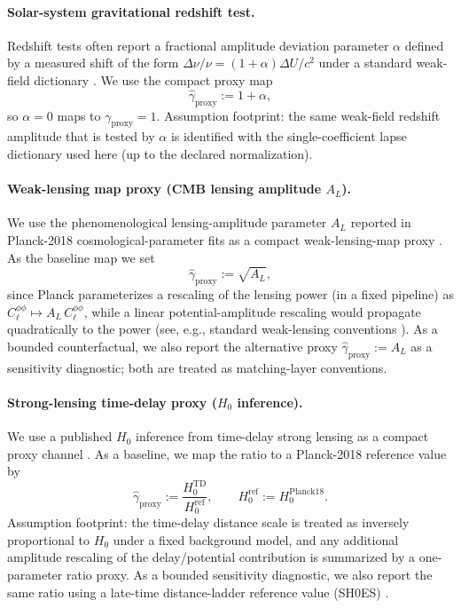 \paragraph{Solar-system gravitational redshift test.}
\MatchTag Redshift tests often report a fractional amplitude deviation parameter $\alpha$ defined by a measured shift of the form
$\Delta\nu/\nu=(1+\alpha)\Delta U/c^2$ under a standard weak-field dictionary \cite{Delva2018GalileoRedshift}.
We use the compact proxy map
\[
\widehat\gamma_{\mathrm{proxy}}:=1+\alpha,
\]
so $\alpha=0$ maps to $\gamma_{\mathrm{proxy}}=1$.
\AuditTag Assumption footprint: the same weak-field redshift amplitude that is tested by $\alpha$ is identified with the single-coefficient lapse dictionary
used here (up to the declared normalization).

\paragraph{Weak-lensing map proxy (CMB lensing amplitude \texorpdfstring{$A_L$}{A\_L}).}
\MatchTag We use the phenomenological lensing-amplitude parameter $A_L$ reported in Planck-2018 cosmological-parameter fits
as a compact weak-lensing-map proxy \cite{Planck2018Parameters}.
As the baseline map we set
\[
\widehat\gamma_{\mathrm{proxy}}:=\sqrt{A_L},
\]
since Planck parameterizes a rescaling of the lensing power (in a fixed pipeline) as $C_\ell^{\phi\phi}\mapsto A_L\,C_\ell^{\phi\phi}$, while a linear potential-amplitude rescaling would propagate quadratically to the power (see, e.g., standard weak-lensing conventions \cite{BartelmannSchneider2001}).
\AuditTag As a bounded counterfactual, we also report the alternative proxy $\widehat\gamma_{\mathrm{proxy}}:=A_L$ as a sensitivity diagnostic;
both are treated as matching-layer conventions.

\paragraph{Strong-lensing time-delay proxy (\texorpdfstring{$H_0$}{H0} inference).}
\MatchTag We use a published $H_0$ inference from time-delay strong lensing as a compact proxy channel \cite{Wong2019H0LiCOWXIII}.
As a baseline, we map the ratio to a Planck-2018 reference value \cite{Planck2018Parameters} by
\[
\widehat\gamma_{\mathrm{proxy}}:=\frac{H_0^{\mathrm{TD}}}{H_0^{\mathrm{ref}}},
\qquad
H_0^{\mathrm{ref}}:=H_0^{\mathrm{Planck18}}.
\]
\AuditTag Assumption footprint: the time-delay distance scale is treated as inversely proportional to $H_0$ under a fixed background model,
and any additional amplitude rescaling of the delay/potential contribution is summarized by a one-parameter ratio proxy. As a bounded sensitivity diagnostic,
we also report the same ratio using a late-time distance-ladder reference value (SH0ES) \cite{Riess2019SH0ES}.

